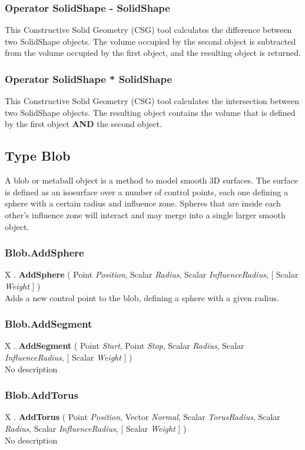 \documentclass[10pt]{book}
\begin{document}
\subsubsection{Operator SolidShape - SolidShape \label{O:SolidShape-SolidShape}}
This Constructive Solid Geometry (CSG) tool calculates the difference between two SolidShape objects. The volume occupied by the second object is subtracted from the volume occupied by the first object, and the resulting object is returned.

\subsubsection{Operator SolidShape * SolidShape \label{O:SolidShape*SolidShape}}
This Constructive Solid Geometry (CSG) tool calculates the intersection between two SolidShape objects. The resulting object contains the volume that is defined by the first object \textbf{AND} the second object.

\subsection{Type Blob \label{T:Blob}}
A blob or metaball object is a method to model smooth 3D surfaces. The surface is defined as an isosurface over a number of control points, each one defining a sphere with a certain radius and influence zone. Spheres that are inside each other's influence zone will interact and may merge into a single larger smooth object.

\subsubsection{Blob.AddSphere \label{F:Blob:AddSphere}}
X . \textbf{AddSphere} ( Point \textit{Position}, Scalar \textit{Radius}, Scalar \textit{InfluenceRadius},  [ Scalar \textit{Weight} ] ) \\
Adds a new control point to the blob, defining a sphere with a given radius.

\subsubsection{Blob.AddSegment \label{F:Blob:AddSegment}}
X . \textbf{AddSegment} ( Point \textit{Start}, Point \textit{Stop}, Scalar \textit{Radius}, Scalar \textit{InfluenceRadius},  [ Scalar \textit{Weight} ] ) \\
No description

\subsubsection{Blob.AddTorus \label{F:Blob:AddTorus}}
X . \textbf{AddTorus} ( Point \textit{Position}, Vector \textit{Normal}, Scalar \textit{TorusRadius}, Scalar \textit{Radius}, Scalar \textit{InfluenceRadius},  [ Scalar \textit{Weight} ] ) \\
No description
\end{document}
